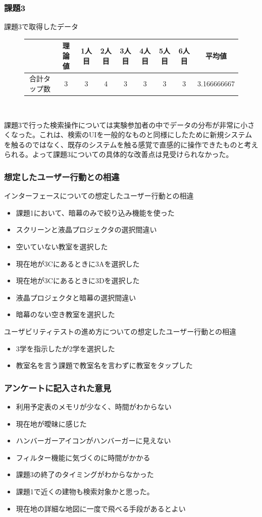\documentclass[12pt,a4paper,dvipdf]{jsarticle}
\begin{document}
\subsubsection{課題3}
課題3で取得したデータ\\
\begin{figure}[H]
    \centering
    \begin{tabular}{c|c|c|c|c|c|c|c|c}
               & 理論値 & 1人目 & 2人目 & 3人目 & 4人目 & 5人目 & 6人目 & 平均値         \\
        \hline
        合計タップ数 & 3   & 3   & 4   & 3   & 3   & 3   & 3   & 3.166666667
    \end{tabular}\\
\end{figure}
課題3で行った検索操作については実験参加者の中でデータの分布が非常に小さくなった。これは、検索のUIを一般的なものと同様にしたために新規システムを触るのではなく、既存のシステムを触る感覚で直感的に操作できたものと考えられる。よって課題3についての具体的な改善点は見受けられなかった。
\subsubsection{想定したユーザー行動との相違}
\noindent
インターフェースについての想定したユーザー行動との相違
\begin{itemize}
    \item 課題1において、暗幕のみで絞り込み機能を使った
    \item スクリーンと液晶プロジェクタの選択間違い
    \item 空いていない教室を選択した
    \item 現在地が3Cにあるときに3Aを選択した
    \item 現在地が3Cにあるときに3Dを選択した
    \item 液晶プロジェクタと暗幕の選択間違い
    \item 暗幕のない空き教室を選択した
\end{itemize}
ユーザビリティテストの進め方についての想定したユーザー行動との相違
\begin{itemize}
    \item 3学を指示したが2学を選択した
    \item 教室名を言う課題で教室名を言わずに教室をタップした
\end{itemize}

\subsubsection{アンケートに記入された意見}
\begin{itemize}
    \item 利用予定表のメモリが少なく、時間がわからない
    \item 現在地が曖昧に感じた
    \item ハンバーガーアイコンがハンバーガーに見えない
    \item フィルター機能に気づくのに時間がかかる
    \item 課題3の終了のタイミングがわからなかった
    \item 課題1で近くの建物も検索対象かと思った。
    \item 現在地の詳細な地図に一度で飛べる手段があるとよい
\end{itemize}
\end{document}
